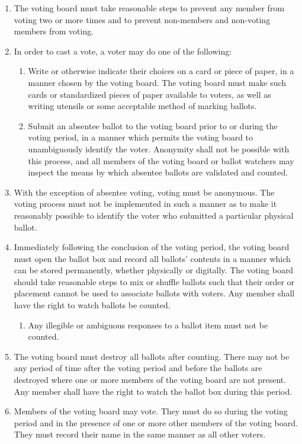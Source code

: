 \documentclass[11pt]{article}
\newcounter{h1}
\newcounter{h2}[h1]
\newcounter{h3}[h2]
\begin{document}
\begin{enumerate}
  \item The voting board must take reasonable steps to prevent any member from voting two or more times and to prevent non-members and non-voting members from voting.  
  \item In order to cast a vote, a voter may do one of the following:  
  \begin{enumerate}
    \item Write or otherwise indicate their choices on a card or piece of paper, in a manner chosen by the voting board. The voting board must make such cards or standardized pieces of paper available to voters, as well as writing utensils or some acceptable method of marking ballots.  
    \item Submit an absentee ballot to the voting board prior to or during the voting period, in a manner which permits the voting board to unambiguously identify the voter. Anonymity shall not be possible with this process, and all members of the voting board or ballot watchers may inspect the means by which absentee ballots are validated and counted.  
  \end{enumerate}
  \item With the exception of absentee voting, voting must be anonymous. The voting process must not be implemented in such a manner as to make it reasonably possible to identify the voter who submitted a particular physical ballot.  
  \item Immediately following the conclusion of the voting period, the voting board must open the ballot box and record all ballots' contents in a manner which can be stored permanently, whether physically or digitally. The voting board should take reasonable steps to mix or shuffle ballots such that their order or placement cannot be used to associate ballots with voters. Any member shall have the right to watch ballots be counted.  
  \begin{enumerate}
    \item Any illegible or ambiguous responses to a ballot item must not be counted.  
  \end{enumerate}
  \item The voting board must destroy all ballots after counting. There may not be any period of time after the voting period and before the ballots are destroyed where one or more members of the voting board are not present. Any member shall have the right to watch the ballot box during this period.  
  \item Members of the voting board may vote. They must do so during the voting period and in the presence of one or more other members of the voting board. They must record their name in the same manner as all other voters.
\end{enumerate}
\end{document}
